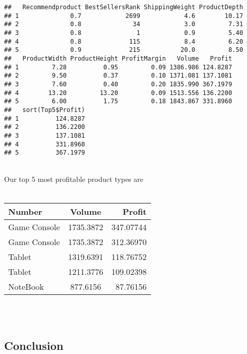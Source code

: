 \documentclass[]{article}
\begin{document}
\begin{verbatim}
##   Recommendproduct BestSellersRank ShippingWeight ProductDepth
## 1              0.7            2699            4.6        10.17
## 2              0.8              34            3.0         7.31
## 3              0.8               1            0.9         5.40
## 4              0.8             115            8.4         6.20
## 5              0.9             215           20.0         8.50
##   ProductWidth ProductHeight ProfitMargin   Volume   Profit
## 1         7.28          0.95         0.09 1386.986 124.8287
## 2         9.50          0.37         0.10 1371.081 137.1081
## 3         7.60          0.40         0.20 1835.990 367.1979
## 4        13.20         13.20         0.09 1513.556 136.2200
## 5         6.00          1.75         0.18 1843.867 331.8960
##   sort(Top5$Profit)
## 1          124.8287
## 2          136.2200
## 3          137.1081
## 4          331.8960
## 5          367.1979
\end{verbatim}

 \\
 Our top 5 most profitable product types are \\
 \\

\begin{longtable}[]{@{}lcr@{}}
\toprule
Number & Volume & Profit\tabularnewline
\midrule
\endhead
Game Console & 1735.3872 & 347.07744\tabularnewline
Game Console & 1735.3872 & 312.36970\tabularnewline
Tablet & 1319.6391 & 118.76752\tabularnewline
Tablet & 1211.3776 & 109.02398\tabularnewline
NoteBook & 877.6156 & 87.76156\tabularnewline
\bottomrule
\end{longtable}

\\
 \\

\subsection{Conclusion}\label{conclusion}

 \\
\end{document}
